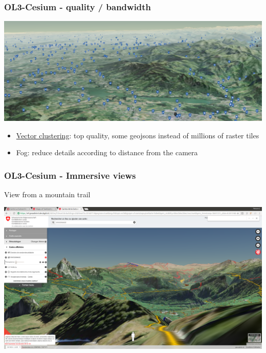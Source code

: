 \documentclass[handout]{beamer}
\begin{document}
  \begin{frame}
    \frametitle{OL3-Cesium - quality / bandwidth}
    \begin{center}
      \includegraphics[width=\linewidth]{./images/schweizmobil_fog.png}
    \end{center}

    \begin{itemize}
     \item \href {https://github.com/gberaudo/ol3-cluster-tool}{Vector clustering}: top quality, some geojsons instead of millions of raster tiles
     \item Fog: reduce details according to distance from the camera
    \end{itemize}
  \end{frame}


  \begin{frame}
    \frametitle{OL3-Cesium - Immersive views}
    View from a mountain trail
    \begin{center}
      \includegraphics[width=\linewidth]{./images/geoadmin_immersive_view.png}
    \end{center}
  \end{frame}
\end{document}
